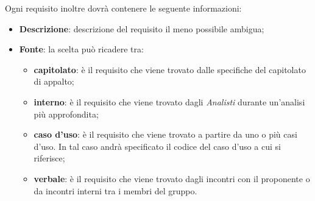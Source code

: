 			\noindent
			Ogni requisito inoltre dovrà contenere le seguente informazioni:
				\begin{itemize}
					\item \textbf{Descrizione}: descrizione del requisito il meno possibile ambigua;
					\item \textbf{Fonte}: la scelta può ricadere tra:
						\begin{itemize}
							\item \textbf{capitolato}: è il requisito che viene trovato dalle specifiche del capitolato di appalto;
							\item \textbf{interno}: è il requisito che viene trovato dagli \emph{Analisti} durante un'analisi più approfondita;
							\item \textbf{caso d'uso}: è il requisito che viene trovato a partire da uno o più casi d'uso. In tal caso andrà specificato il codice del caso d'uso a cui si riferisce;
							\item \textbf{verbale}: è il requisito che viene trovato dagli incontri con il proponente o da incontri interni tra i membri del gruppo.
						\end{itemize}
				\end{itemize}

